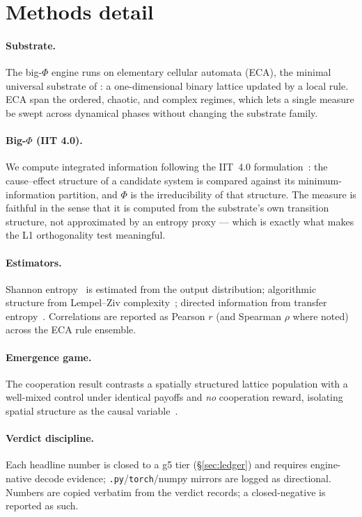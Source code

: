 \documentclass[11pt,a4paper]{article}
\begin{document}
\section{Methods detail}
\label{sec:methods}
\paragraph{Substrate.}
The big-$\Phi$ engine runs on elementary cellular automata (ECA), the minimal
universal substrate of \citet{wolfram2002nks}: a one-dimensional binary lattice
updated by a local rule. ECA span the ordered, chaotic, and complex regimes,
which lets a single measure be swept across dynamical phases without changing the
substrate family.

\paragraph{Big-$\Phi$ (IIT 4.0).}
We compute integrated information following the IIT~4.0
formulation~\citep{albantakis2023iit4}: the cause--effect structure of a
candidate system is compared against its minimum-information partition, and
$\Phi$ is the irreducibility of that structure. The measure is faithful in the
sense that it is computed from the substrate's own transition structure, not
approximated by an entropy proxy --- which is exactly what makes the L1
orthogonality test meaningful.

\paragraph{Estimators.}
Shannon entropy~\citep{shannon1948} is estimated from the output distribution;
algorithmic structure from Lempel--Ziv complexity~\citep{lempel1976lz}; directed
information from transfer entropy~\citep{schreiber2000te}. Correlations are
reported as Pearson $r$ (and Spearman $\rho$ where noted) across the ECA rule
ensemble.

\paragraph{Emergence game.}
The cooperation result contrasts a spatially structured lattice population with a
well-mixed control under identical payoffs and \emph{no} cooperation reward,
isolating spatial structure as the causal variable~\citep{nowak2006five}.

\paragraph{Verdict discipline.}
Each headline number is closed to a g5 tier (\S\ref{sec:ledger}) and requires
engine-native decode evidence; \texttt{.py}/\texttt{torch}/numpy mirrors are
logged as directional. Numbers are copied verbatim from the verdict records; a
closed-negative is reported as such.
\end{document}
